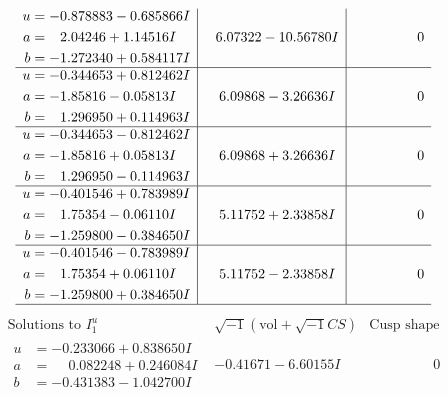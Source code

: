 \documentclass[1p]{elsarticle_modified}
\theoremstyle{definition}
\newcommand{\I}{\sqrt{-1}}
\begin{document}
$$\begin{array}{c|c|c}
\begin{aligned}
u &= -0.878883 - 0.685866 I \\
a &= \phantom{-}2.04246 + 1.14516 I \\
b &= -1.272340 + 0.584117 I\end{aligned}
 & \phantom{-}6.07322 - 10.56780 I & \phantom{-0.000000 } 0 \\ \hline\begin{aligned}
u &= -0.344653 + 0.812462 I \\
a &= -1.85816 - 0.05813 I \\
b &= \phantom{-}1.296950 + 0.114963 I\end{aligned}
 & \phantom{-}6.09868 - 3.26636 I & \phantom{-0.000000 } 0 \\ \hline\begin{aligned}
u &= -0.344653 - 0.812462 I \\
a &= -1.85816 + 0.05813 I \\
b &= \phantom{-}1.296950 - 0.114963 I\end{aligned}
 & \phantom{-}6.09868 + 3.26636 I & \phantom{-0.000000 } 0 \\ \hline\begin{aligned}
u &= -0.401546 + 0.783989 I \\
a &= \phantom{-}1.75354 - 0.06110 I \\
b &= -1.259800 - 0.384650 I\end{aligned}
 & \phantom{-}5.11752 + 2.33858 I & \phantom{-0.000000 } 0 \\ \hline\begin{aligned}
u &= -0.401546 - 0.783989 I \\
a &= \phantom{-}1.75354 + 0.06110 I \\
b &= -1.259800 + 0.384650 I\end{aligned}
 & \phantom{-}5.11752 - 2.33858 I & \phantom{-0.000000 } 0\\
 \hline 
 \end{array}$$\newpage$$\begin{array}{c|c|c}  
\text{Solutions to }I^u_{1}& \I (\text{vol} + \sqrt{-1}CS) & \text{Cusp shape}\\
 \hline 
\begin{aligned}
u &= -0.233066 + 0.838650 I \\
a &= \phantom{-}0.082248 + 0.246084 I \\
b &= -0.431383 - 1.042700 I\end{aligned}
 & -0.41671 - 6.60155 I & \phantom{-0.000000 } 0 \\ \hline\begin{aligned}

\end{aligned}
\end{array}$$
\end{document}

